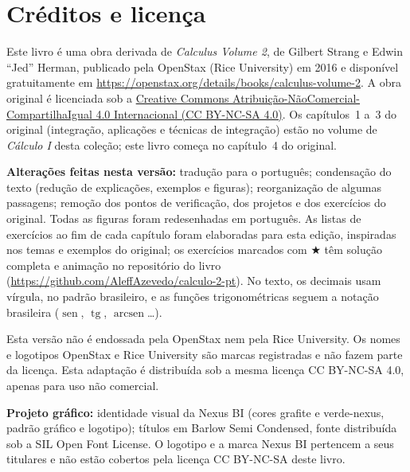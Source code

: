 \documentclass[11pt,openany]{book}
\newcommand{\estrela}{\textcolor{laranja}{$\bigstar$}}
\DeclareMathOperator{\sen}{sen}
\DeclareMathOperator{\tg}{tg}
\DeclareMathOperator{\arcsen}{arcsen}
\begin{document}
\frontmatter


\thispagestyle{plain}
\section*{Créditos e licença}
Este livro é uma obra derivada de \emph{Calculus Volume 2}, de Gilbert Strang e Edwin
``Jed'' Herman, publicado pela OpenStax (Rice University) em 2016 e disponível
gratuitamente em \url{https://openstax.org/details/books/calculus-volume-2}.
A obra original é licenciada sob a
\href{https://creativecommons.org/licenses/by-nc-sa/4.0/}{Creative Commons
Atribuição-NãoComercial-CompartilhaIgual 4.0 Internacional (CC BY-NC-SA 4.0)}.
Os capítulos~1 a~3 do original (integração, aplicações e técnicas de integração) estão no
volume de \emph{Cálculo I} desta coleção; este livro começa no capítulo~4 do original.

\textbf{Alterações feitas nesta versão:} tradução para o português; condensação do texto
(redução de explicações, exemplos e figuras); reorganização de algumas passagens; remoção dos
pontos de verificação, dos projetos e dos exercícios do original. Todas as figuras foram
redesenhadas em português. As listas de exercícios ao fim de cada capítulo foram
elaboradas para esta edição, inspiradas nos temas e exemplos do original; os exercícios
marcados com \estrela{} têm solução completa e animação no repositório do livro
(\url{https://github.com/AleffAzevedo/calculo-2-pt}). No texto, os decimais usam vírgula, no
padrão brasileiro, e as funções trigonométricas seguem a notação brasileira ($\sen$, $\tg$,
$\arcsen$\dots).

Esta versão não é endossada pela OpenStax nem pela Rice University. Os nomes e logotipos
OpenStax e Rice University são marcas registradas e não fazem parte da licença.
Esta adaptação é distribuída sob a mesma licença CC BY-NC-SA 4.0, apenas para uso não comercial.

\textbf{Projeto gráfico:} identidade visual da Nexus BI (cores grafite e verde-nexus, padrão
gráfico e logotipo); títulos em Barlow Semi Condensed, fonte distribuída sob a SIL Open Font
License. O logotipo e a marca Nexus BI pertencem a seus titulares e não estão cobertos pela
licença CC BY-NC-SA deste livro.

\tableofcontents

\mainmatter



\backmatter
\printindex
\end{document}
